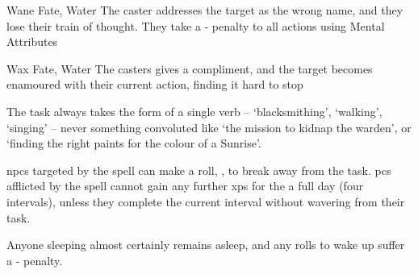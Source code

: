   {}%
  {Wane}%
  {Fate, Water}%
  {}%
  {The caster addresses the target as the wrong name, and they lose their train of thought.
    They take a - penalty to all actions using Mental Attributes}%
  {}

  {}%
  {Wax}%
  {Fate, Water}%
  {}%
  {The casters gives a compliment, and the target becomes enamoured with their current action, finding it hard to stop}%
  {
    The task always takes the form of a single verb -- `blacksmithing', `walking', `singing' -- never something convoluted like `the mission to kidnap the warden', or `finding the right paints for the colour of a Sunrise'.

    \Glspl{npc} targeted by the spell can make a  roll, \tn[8], to break away from the task.
    \Glspl{pc} afflicted by the spell cannot gain any further \glspl{xp} for the a full day (four \glspl{interval}), unless they complete the current \gls{interval} without wavering from their task.

  Anyone sleeping almost certainly remains asleep, and any rolls to wake up suffer a - penalty.}

